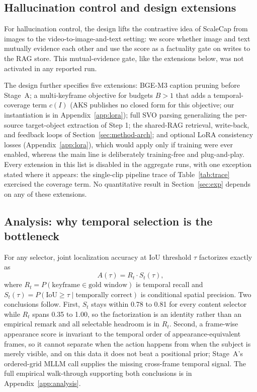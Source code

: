 \documentclass[10pt]{article}
\begin{document}
\subsection{Hallucination control and design extensions}\label{sec:method-halluc}

For hallucination control, the design lifts the contrastive idea of ScaleCap \citep{scalecap2506} from images to the video-to-image-and-text setting: we score whether image and text mutually evidence each other and use the score as a factuality gate on writes to the RAG store. This mutual-evidence gate, like the extensions below, was not activated in any reported run.

The design further specifies five extensions: BGE-M3 caption pruning \citep{videoespresso2411} before Stage~A; a multi-keyframe objective for budgets $B > 1$ that adds a temporal-coverage term $c(I)$ (AKS \citep{aks2502} publishes no closed form for this objective; our instantiation is in Appendix~\ref{app:lora}); full SVO parsing generalizing the per-source target-object extraction of Step 1; the shared-RAG retrieval, write-back, and feedback loops of Section~\ref{sec:method-arch}; and optional LoRA consistency losses (Appendix~\ref{app:lora}), which would apply only if training were ever enabled, whereas the main line is deliberately training-free and plug-and-play. Every extension in this list is disabled in the aggregate runs, with one exception stated where it appears: the single-clip pipeline trace of Table~\ref{tab:trace} exercised the coverage term. No quantitative result in Section~\ref{sec:exp} depends on any of these extensions.

\subsection{Analysis: why temporal selection is the bottleneck}\label{sec:method-analysis}

For any selector, joint localization accuracy at IoU threshold $\tau$ factorizes exactly as
\begin{equation}
A(\tau) = R_t \cdot S_t(\tau),
\end{equation}
where $R_t = P(\text{keyframe} \in \text{gold window})$ is temporal recall and $S_t(\tau) = P(\mathrm{IoU} \ge \tau \mid \text{temporally correct})$ is conditional spatial precision. Two conclusions follow. First, $S_t$ stays within 0.78 to 0.81 for every content selector while $R_t$ spans 0.35 to 1.00, so the factorization is an identity rather than an empirical remark and all selectable headroom is in $R_t$. Second, a frame-wise appearance score is invariant to the temporal order of appearance-equivalent frames, so it cannot separate when the action happens from when the subject is merely visible, and on this data it does not beat a positional prior; Stage~A's ordered-grid MLLM call supplies the missing cross-frame temporal signal. The full empirical walk-through supporting both conclusions is in Appendix~\ref{app:analysis}.
\end{document}
